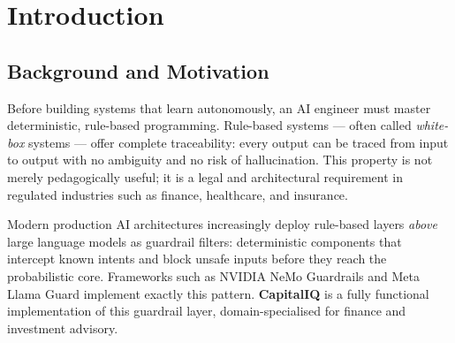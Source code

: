\documentclass[12pt, a4paper]{article}
\begin{document}
\begin{abstract}
\noindent
This report presents \textbf{CapitalIQ}, a production-quality, rule-based AI chatbot
developed as Project 1 of the DecodeLabs Artificial Intelligence Industrial Training
Programme (Batch 2026). CapitalIQ operates as a Finance \& Investment Advisor,
responding to user queries across 16 intent categories including stocks, bonds, ETFs,
cryptocurrency, inflation, compound interest, and portfolio strategy. The system is
built entirely on deterministic logic using the Python Standard Library, implementing
the \textbf{Input-Process-Output (IPO)} model with O(1) dictionary-based intent routing.
Two phases are documented: Phase 1 satisfies all DecodeLabs specification requirements;
Phase 2 adds confidence scoring, conversation memory, slot filling, and session
personalisation. The project includes a 19-cell Jupyter Notebook, a modular Python
package, and a 61-test unit suite achieving 100\% pass rate.
\end{abstract}

\tableofcontents
\newpage

\section{Introduction}

\subsection{Background and Motivation}

Before building systems that learn autonomously, an AI engineer must master
deterministic, rule-based programming. Rule-based systems --- often called
\textit{white-box} systems --- offer complete traceability: every output can be
traced from input to output with no ambiguity and no risk of hallucination.
This property is not merely pedagogically useful; it is a legal and architectural
requirement in regulated industries such as finance, healthcare, and insurance.

Modern production AI architectures increasingly deploy rule-based layers
\textit{above} large language models as guardrail filters: deterministic
components that intercept known intents and block unsafe inputs before
they reach the probabilistic core. Frameworks such as NVIDIA NeMo Guardrails
and Meta Llama Guard implement exactly this pattern. \textbf{CapitalIQ} is a
fully functional implementation of this guardrail layer, domain-specialised for
finance and investment advisory.
\end{document}
